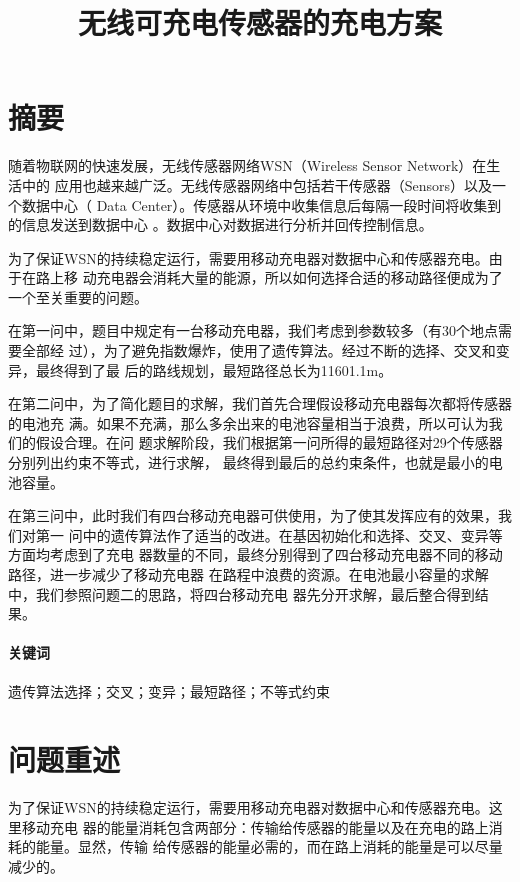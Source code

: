 \documentclass{ctexart}
\title{无线可充电传感器的充电方案}
\date{}
\begin{document}
    \maketitle

    \section*{摘要}
    随着物联网的快速发展，无线传感器网络WSN（Wireless Sensor Network）在生活中的
    应用也越来越广泛。无线传感器网络中包括若干传感器（Sensors）以及一个数据中心（
    Data Center）。传感器从环境中收集信息后每隔一段时间将收集到的信息发送到数据中心
    。数据中心对数据进行分析并回传控制信息。

    为了保证WSN的持续稳定运行，需要用移动充电器对数据中心和传感器充电。由于在路上移
    动充电器会消耗大量的能源，所以如何选择合适的移动路径便成为了一个至关重要的问题。
    
    在第一问中，题目中规定有一台移动充电器，我们考虑到参数较多（有30个地点需要全部经
    过），为了避免指数爆炸，使用了遗传算法。经过不断的选择、交叉和变异，最终得到了最
    后的路线规划，最短路径总长为11601.1m。

    在第二问中，为了简化题目的求解，我们首先合理假设移动充电器每次都将传感器的电池充
    满。如果不充满，那么多余出来的电池容量相当于浪费，所以可认为我们的假设合理。在问
    题求解阶段，我们根据第一问所得的最短路径对29个传感器分别列出约束不等式，进行求解，
    最终得到最后的总约束条件，也就是最小的电池容量。

    在第三问中，此时我们有四台移动充电器可供使用，为了使其发挥应有的效果，我们对第一
    问中的遗传算法作了适当的改进。在基因初始化和选择、交叉、变异等方面均考虑到了充电
    器数量的不同，最终分别得到了四台移动充电器不同的移动路径，进一步减少了移动充电器
    在路程中浪费的资源。在电池最小容量的求解中，我们参照问题二的思路，将四台移动充电
    器先分开求解，最后整合得到结果。
    
    \paragraph{关键词}遗传算法选择；交叉；变异；最短路径；不等式约束
    \newpage

    \section{问题重述}
    为了保证WSN的持续稳定运行，需要用移动充电器对数据中心和传感器充电。这里移动充电
    器的能量消耗包含两部分：传输给传感器的能量以及在充电的路上消耗的能量。显然，传输
    给传感器的能量必需的，而在路上消耗的能量是可以尽量减少的。
\end{document}
